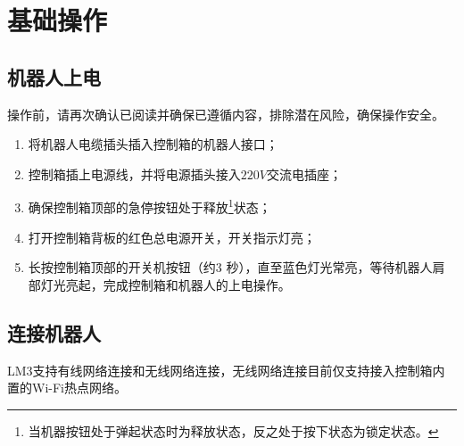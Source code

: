 \chapter{基础操作}
\label{cha:基础操作}

\section{机器人上电}

操作前，请再次确认已阅读并确保已遵循内容，排除潜在风险，确保操作安全。

\begin{enumerate}
\item 将机器人电缆插头插入控制箱的机器人接口；
\item 控制箱插上电源线，并将电源插头接入$220 \unit{V}$交流电插座；
\item 确保控制箱顶部的急停按钮处于释放\footnote{当机器按钮处于弹起状态时为释放状态，反之处于按下状态为锁定状态。}状态；
\item 打开控制箱背板的红色总电源开关，开关指示灯亮；
\item 长按控制箱顶部的开关机按钮（约3 秒），直至蓝色灯光常亮，等待机器人肩部灯光亮起，完成控制箱和机器人的上电操作。
\end{enumerate}



\section{连接机器⼈}
LM3支持有线网络连接和无线网络连接，无线网络连接目前仅支持接入控制箱内置的Wi-Fi热点网络。
